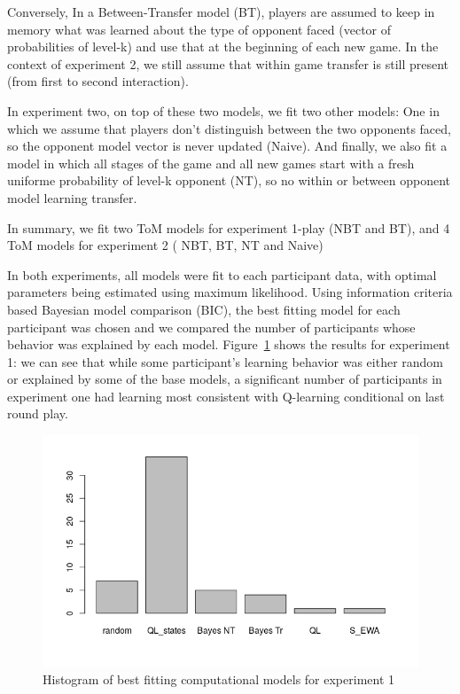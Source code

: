 \documentclass[man,floatsintext]{apa6}
\begin{document}
Conversely, In a Between-Transfer model (BT), players are assumed to keep in memory what was learned about the type of opponent faced (vector of probabilities of level-k) and use that at the beginning of each new game. In the context of experiment 2, we still assume that within game transfer is still present (from first to second interaction).

In experiment two, on top of these two models, we fit two other models: One in which we assume that players don't distinguish between the two opponents faced, so the opponent model vector is never updated (Naive). And finally, we also fit a model in which all stages of the game and all new games start with a fresh uniforme probability of level-k opponent (NT), so no within or between opponent model learning transfer.

In summary, we fit two ToM models for experiment 1-play (NBT and BT), and 4 ToM models for experiment 2 ( NBT, BT, NT and Naive)

In both experiments, all models were fit to each participant data, with optimal parameters being estimated using maximum likelihood. Using information criteria based Bayesian model comparison (BIC), the best fitting model for each participant was chosen and we compared the number of participants whose behavior was explained by each model. Figure~\ref{fig:exp1-comp-models} shows the results for experiment 1: we can see that while some participant's learning behavior was either random or explained by some of the base models, a significant number of participants in experiment one had learning most consistent with Q-learning conditional on last round play.

\begin{figure}

{\centering \includegraphics{../Report/images/exp1_comp_models} 

}

\caption{Histogram of best fitting computational models for experiment 1}\label{fig:exp1-comp-models}
\end{figure}
\end{document}

